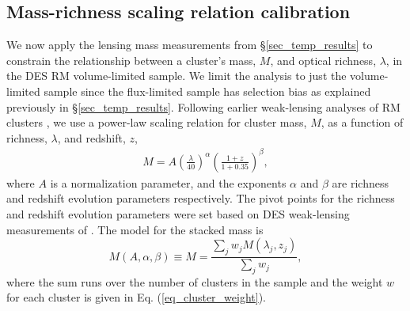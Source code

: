 \subsection{Mass-richness \ML{} scaling relation calibration}\label{sec_ML_scaling}

We now apply the lensing mass measurements from \S\ref{sec_temp_results} to constrain the relationship between a cluster's mass, $M$, and optical richness, $\lambda$, in the DES RM \whichyear{} volume-limited sample. 
We limit the analysis to just the volume-limited sample since the flux-limited sample has selection bias as explained previously in \S\ref{sec_temp_results}.
Following earlier weak-lensing analyses of RM clusters \citep{simet18, melchoir17, mcclintock18}, we use a power-law scaling relation for cluster mass, $M$, as a function of richness, $\lambda$, and redshift, $z$,
\begin{eqnarray}
M = A \left(\frac{\lambda}{40}\right)^{\alpha} \left(\frac{1+z}{1+0.35}\right)^{\beta},
\label{eq_ML}
 \end{eqnarray}
 where $A$ is a normalization parameter, and the exponents $\alpha$ and $\beta$ are richness and redshift evolution parameters respectively. 
The pivot points for the richness and redshift evolution parameters were set based on DES weak-lensing measurements of \cite{mcclintock18}.
The model for the stacked mass is 
\begin{equation}
M(A, \alpha, \beta) \equiv M = \frac{\sum_j w_j M(\lambda_{j}, z_{j})}{\sum_j w_j}, 
\label{eq_model_ML}
\end{equation}
where the sum runs over the number of clusters in the sample and the weight $w$ for each cluster is given in Eq. (\ref{eq_cluster_weight}).
